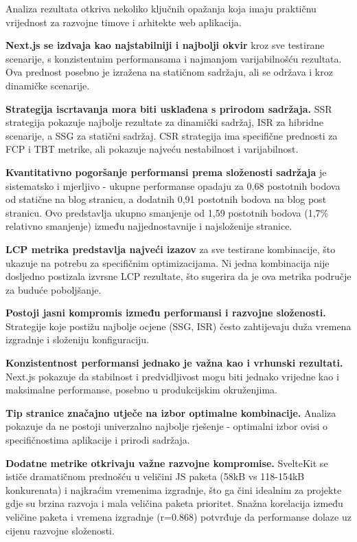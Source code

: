Analiza rezultata otkriva nekoliko ključnih opažanja koja imaju praktičnu vrijednost za razvojne timove i arhitekte web aplikacija.

\textbf{Next.js se izdvaja kao najstabilniji i najbolji okvir} kroz sve testirane scenarije, s konzistentnim performansama i najmanjom varijabilnošću rezultata. Ova prednost posebno je izražena na statičnom sadržaju, ali se održava i kroz dinamičke scenarije.

\textbf{Strategija iscrtavanja mora biti usklađena s prirodom sadržaja.} SSR strategija pokazuje najbolje rezultate za dinamički sadržaj, ISR za hibridne scenarije, a SSG za statični sadržaj. CSR strategija ima specifične prednosti za FCP i TBT metrike, ali pokazuje najveću nestabilnost i varijabilnost.

\textbf{Kvantitativno pogoršanje performansi prema složenosti sadržaja} je sistematsko i mjerljivo - ukupne performanse opadaju za 0,68 postotnih bodova od statične na blog stranicu, a dodatnih 0,91 postotnih bodova na blog post stranicu. Ovo predstavlja ukupno smanjenje od 1,59 postotnih bodova (1,7\% relativno smanjenje) između najjednostavnije i najsloženije stranice.

\textbf{LCP metrika predstavlja najveći izazov} za sve testirane kombinacije, što ukazuje na potrebu za specifičnim optimizacijama. Ni jedna kombinacija nije dosljedno postizala izvrsne LCP rezultate, što sugerira da je ova metrika područje za buduće poboljšanje.

\textbf{Postoji jasni kompromis između performansi i razvojne složenosti.} Strategije koje postižu najbolje ocjene (SSG, ISR) često zahtijevaju duža vremena izgradnje i složeniju konfiguraciju.

\textbf{Konzistentnost performansi jednako je važna kao i vrhunski rezultati.} Next.js pokazuje da stabilnost i predvidljivost mogu biti jednako vrijedne kao i maksimalne performanse, posebno u produkcijskim okruženjima.

\textbf{Tip stranice značajno utječe na izbor optimalne kombinacije.} Analiza pokazuje da ne postoji univerzalno najbolje rješenje - optimalni izbor ovisi o specifičnostima aplikacije i prirodi sadržaja.

\textbf{Dodatne metrike otkrivaju važne razvojne kompromise.} SvelteKit se ističe dramatičnom prednošću u veličini JS paketa (58kB vs 118-154kB konkurenata) i najkraćim vremenima izgradnje, što ga čini idealnim za projekte gdje su brzina razvoja i mala veličina paketa prioritet. Snažna korelacija između veličine paketa i vremena izgradnje (r=0.868) potvrđuje da performanse dolaze uz cijenu razvojne složenosti.

